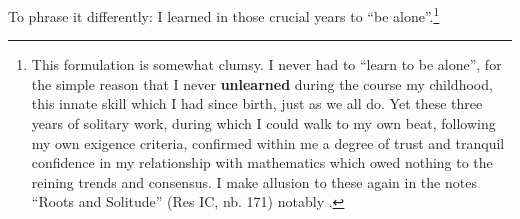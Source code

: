 To phrase it differently: I learned in those crucial years to ``be alone''.\footnote{
This formulation is somewhat clumsy. I never had to ``learn to be alone'', for the simple
reason that I never \textbf{unlearned} during the course my childhood, 
this innate skill which I had since birth, just as we all do. Yet these three years of
solitary work, during which I could walk to my own beat, 
following my own exigence criteria, confirmed within me a degree of trust and tranquil confidence 
in my relationship with mathematics which owed nothing to the reining trends and
consensus. I make allusion to these again in the notes ``Roots and Solitude'' (Res IC, nb.
171) notably 
.
}


